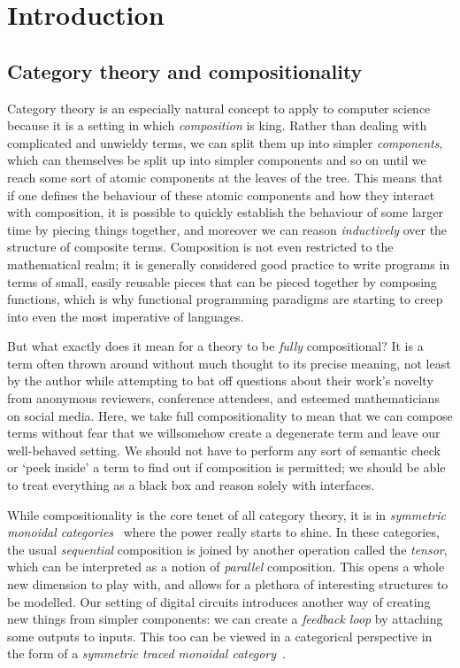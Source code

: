 \chapter{Introduction}




\section{Category theory and compositionality}

Category theory is an especially natural concept to apply to computer science
because it is a setting in which \emph{composition} is king.
Rather than dealing with complicated and unwieldy terms, we can split them
up into simpler \emph{components}, which can themselves be split up into simpler
components and so on until we reach some sort of atomic components at the leaves
of the tree.
This means that if one defines the behaviour of these atomic components and
how they interact with composition, it is possible to quickly establish the
behaviour of some larger time by piecing things together, and moreover we can
reason \emph{inductively} over the structure of composite terms.
Composition is not even restricted to the mathematical realm; it is generally
considered good practice to write programs in terms of small, easily reusable
pieces that can be pieced together by composing functions, which is why
functional programming paradigms are starting to creep into even the most
imperative of languages.

But what exactly does it mean for a theory to be \emph{fully} compositional?
It is a term often thrown around without much thought to its precise meaning,
not least by the author while attempting to bat off questions about their work's
novelty from anonymous reviewers, conference attendees, and esteemed
mathematicians on social media.
Here, we take full compositionality to mean that we can compose terms without
fear that we willsomehow create a degenerate term and leave our well-behaved
setting.
We should not have to perform any sort of semantic check or `peek inside' a term
to find out if composition is permitted; we should be able to treat everything
as a black box and reason solely with interfaces.

While compositionality is the core tenet of all category theory, it is in
\emph{symmetric monoidal categories}~\cite{maclane1963natural} where the power
really starts to shine.
In these categories, the usual \emph{sequential} composition is joined by
another operation called the \emph{tensor}, which can be interpreted as a notion
of \emph{parallel} composition.
This opens a whole new dimension to play with, and allows for a plethora of
interesting structures to be modelled.
Our setting of digital circuits introduces another way of creating new things
from simpler components: we can create a \emph{feedback loop} by attaching some
outputs to inputs.
This too can be viewed in a categorical perspective in the form of a
\emph{symmetric traced monoidal category}~\cite{joyal1996traced}.

